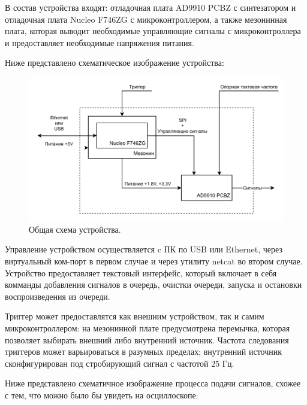 \documentclass[rusmathsym, eqnumwithinsec, amspack, hyperref]{bomgost}
\begin{document}
В состав устройства входят: отладочная плата AD9910 PCBZ с синтезатором и отладочная плата Nucleo F746ZG с микроконтроллером, а также мезонинная плата, которая выводит необходимые управляющие сигналы с микроконтроллера и предоставляет необходимые напряжения питания.

Ниже представлено схематическое изображение устройства:

%
%
\begin{gostfigure}
\begin{figure}[H]
\centering
\includegraphics{data/system_architecture.drawio.pdf}
\caption{Общая схема устройства.}
\label{fig:system_architecture}
\end{figure}
\end{gostfigure}

Управление устройством осуществляется c ПК по USB или Ethernet, через виртуальный ком-порт в первом случае и через утилиту netcat во втором случае. Устройство предоставляет текстовый интерфейс, который включает в себя комманды добавления сигналов в очередь, очистки очереди, запуска и остановки воспроизведения из очереди.

\pagebreak

Триггер может предоставлятся как внешним устройством, так и самим микроконтроллером: на мезонинной плате предусмотрена перемычка, которая позволяет выбирать внешний либо внутренний источник. Частота следования триггеров может варьироваться в разумных пределах; внутренний источник сконфигурирован под стробирующий сигнал с частотой 25 Гц.

Ниже представлено схематичное изображение процесса подачи сигналов, схожее с тем, что можно было бы увидеть на осциллоскопе:
\end{document}
